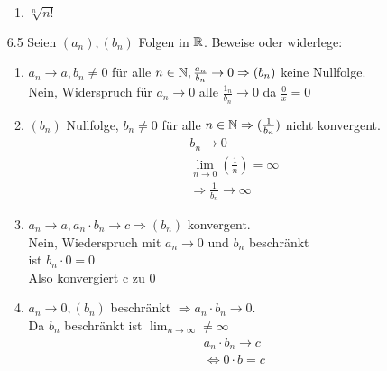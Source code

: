 \documentclass{HM}
\begin{document}
\begin{enumerate}
\begin{enumerate}
		\item $\sqrt[n]{n!}$\\
		
	\end{enumerate}
	\item[6.5] Seien $(a_n), (b_n)$ Folgen in $\mathbb{R}$. Beweise oder widerlege:
	\begin{enumerate}
		\item $a_n\to a, b_n\neq 0$ für alle $n\in\mathbb{N}, \frac{a_n}{b_n}\to 0 \Rightarrow (b_n)$ keine Nullfolge.\\
		Nein, Widerspruch für $a_n \to 0$ alle $\frac{1_n}{b_n}\to 0$ da $\frac{0}{x}=0$ 
		\item $(b_n)$ Nullfolge, $b_n\neq 0$ für alle $n\in\mathbb{N}\Rightarrow (\frac{1}{b_n})$ nicht konvergent.\\
		\begin{align*}
			b_n \to 0\\
			\lim_{n\to 0}\left(\frac{1}{n}\right)=\infty\\
			\Rightarrow \frac{1}{b_n} \to \infty
		\end{align*}
		\item $a_n\to a, a_n\cdot b_n \to c \Rightarrow (b_n)$ konvergent.\\
		Nein, Wiederspruch mit $a_n \to 0$ und $b_n$ beschränkt\\
		ist $b_n \cdot 0 = 0$\\
		Also konvergiert c zu $0$ 
		\item $a_n\to 0, (b_n)$ beschränkt $\Rightarrow a_n\cdot b_n \to 0$.\\
		Da $b_n$ beschränkt ist $\lim_{n\to \infty} \neq \infty$
		\begin{align*}
			a_n \cdot b_n \to c\\
			\Leftrightarrow 0 \cdot b = c
		\end{align*}
		

\end{enumerate}
\end{enumerate}
\end{document}
